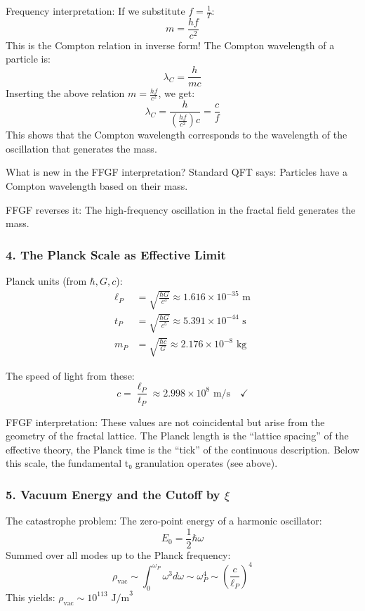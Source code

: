 \documentclass[12pt,a4paper]{article}
\begin{document}
	Frequency interpretation:
	If we substitute \( f = \frac{1}{T} \):
	\[
	m = \frac{hf}{c^2}
	\]
	This is the Compton relation in inverse form! The Compton wavelength of a particle is:
	\[
	\lambda_C = \frac{h}{mc}
	\]
	Inserting the above relation \( m = \frac{hf}{c^2} \), we get:
	\[
	\lambda_C = \frac{h}{\left(\frac{hf}{c^2}\right)c} = \frac{c}{f}
	\]
	This shows that the Compton wavelength corresponds to the wavelength of the oscillation that generates the mass.
	
	What is new in the FFGF interpretation?
	Standard QFT says: Particles have a Compton wavelength based on their mass.
	
	FFGF reverses it: The high-frequency oscillation in the fractal field generates the mass.
	
	\subsubsection{4. The Planck Scale as Effective Limit}
	Planck units (from \( \hbar, G, c \)):
	\begin{align}
		\ell_P &= \sqrt{\frac{\hbar G}{c^3}} \approx 1.616 \times 10^{-35} \text{ m} \\
		t_P &= \sqrt{\frac{\hbar G}{c^5}} \approx 5.391 \times 10^{-44} \text{ s} \\
		m_P &= \sqrt{\frac{\hbar c}{G}} \approx 2.176 \times 10^{-8} \text{ kg}
	\end{align}
	
	The speed of light from these:
	\[
	c = \frac{\ell_P}{t_P} \approx 2.998 \times 10^8 \text{ m/s} \quad \checkmark
	\]
	
	FFGF interpretation:
	These values are not coincidental but arise from the geometry of the fractal lattice. The Planck length is the ``lattice spacing'' of the effective theory, the Planck time is the ``tick'' of the continuous description. Below this scale, the fundamental t₀ granulation operates (see above).
	
	\subsubsection{5. Vacuum Energy and the Cutoff by \( \xi \)}
	The catastrophe problem:
	The zero-point energy of a harmonic oscillator:
	\[
	E_0 = \frac{1}{2}\hbar\omega
	\]
	Summed over all modes up to the Planck frequency:
	\[
	\rho_{\text{vac}} \sim \int_0^{\omega_P} \omega^3 d\omega \sim \omega_P^4 \sim \left(\frac{c}{\ell_P}\right)^4
	\]
	This yields: \( \rho_{\text{vac}} \sim 10^{113} \text{ J/m}^3 \)
	
\end{document}
